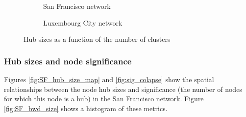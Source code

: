 \begin{figure}
\hfill
\begin{subfigure}{0.45\textwidth}

\caption{San Francisco network}\label{fig:clusters_sf}
\end{subfigure}
\begin{subfigure}{0.45\textwidth}

\caption{Luxembourg City network}\label{fig:clusters_lu}
\end{subfigure}
\caption{Hub sizes as a function of the number of clusters}\label{fig:clusters}
\end{figure}

% 


\subsubsection{Hub sizes and node significance}

Figures \ref{fig:SF_hub_size_map} and \ref{fig:sig_colapse} show the spatial relationships between the node hub sizes and significance (the number of nodes for which this node is a hub) in the San Francisco network. Figure \ref{fig:SF_bwd_size} shows a histogram of these metrics. 

